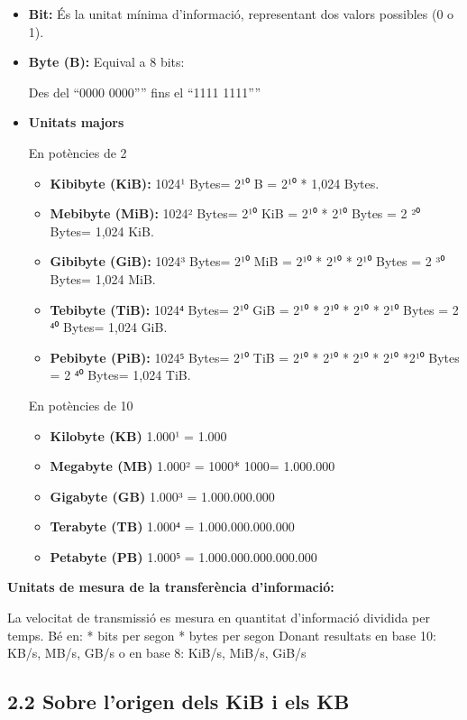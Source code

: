 \documentclass[
  12 pt,
  a4paper,
]{article}
\providecommand{\tightlist}{%
  \setlength{\itemsep}{0pt}\setlength{\parskip}{0pt}}
\begin{document}
\begin{itemize}
\item
  \textbf{Bit:} És la unitat mínima d'informació, representant dos
  valors possibles (0 o 1).
\item
  \textbf{Byte (B):} Equival a 8 bits:

  Des del ``0000 0000'''' fins el ``1111 1111''''
\item
  \textbf{Unitats majors}

  En potències de 2

  \begin{itemize}
  \tightlist
  \item
    \textbf{Kibibyte (KiB):} 1024¹ Bytes= 2¹⁰ B = 2¹⁰ * 1,024 Bytes.
  \item
    \textbf{Mebibyte (MiB):} 1024² Bytes= 2¹⁰ KiB = 2¹⁰ * 2¹⁰ Bytes = 2
    ²⁰ Bytes= 1,024 KiB.
  \item
    \textbf{Gibibyte (GiB):} 1024³ Bytes= 2¹⁰ MiB = 2¹⁰ * 2¹⁰ * 2¹⁰
    Bytes = 2 ³⁰ Bytes= 1,024 MiB.
  \item
    \textbf{Tebibyte (TiB):} 1024⁴ Bytes= 2¹⁰ GiB = 2¹⁰ * 2¹⁰ * 2¹⁰ *
    2¹⁰ Bytes = 2 ⁴⁰ Bytes= 1,024 GiB.
  \item
    \textbf{Pebibyte (PiB):} 1024⁵ Bytes= 2¹⁰ TiB = 2¹⁰ * 2¹⁰ * 2¹⁰ *
    2¹⁰ *2¹⁰ Bytes = 2 ⁴⁰ Bytes= 1,024 TiB.
  \end{itemize}

  En potències de 10

  \begin{itemize}
  \tightlist
  \item
    \textbf{Kilobyte (KB)} 1.000¹ = 1.000
  \item
    \textbf{Megabyte (MB)} 1.000² = 1000* 1000= 1.000.000
  \item
    \textbf{Gigabyte (GB)} 1.000³ = 1.000.000.000
  \item
    \textbf{Terabyte (TB)} 1.000⁴ = 1.000.000.000.000
  \item
    \textbf{Petabyte (PB)} 1.000⁵ = 1.000.000.000.000.000
  \end{itemize}
\end{itemize}

\textbf{Unitats de mesura de la transferència d'informació:}

La velocitat de transmissió es mesura en quantitat d'informació dividida
per temps. Bé en: * bits per segon * bytes per segon Donant resultats en
base 10: KB/s, MB/s, GB/s o en base 8: KiB/s, MiB/s, GiB/s

\subsection{2.2 Sobre l'origen dels KiB i els
KB}\label{sobre-lorigen-dels-kib-i-els-kb}
\end{document}
